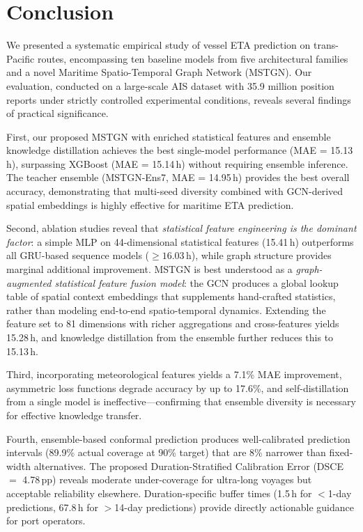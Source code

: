 \documentclass[conference]{IEEEtran}
\begin{document}
\section{Conclusion}

We presented a systematic empirical study of vessel ETA prediction on trans-Pacific routes, encompassing ten baseline models from five architectural families and a novel Maritime Spatio-Temporal Graph Network (MSTGN).
Our evaluation, conducted on a large-scale AIS dataset with 35.9 million position reports under strictly controlled experimental conditions, reveals several findings of practical significance.

First, our proposed MSTGN with enriched statistical features and ensemble knowledge distillation achieves the best single-model performance (MAE = 15.13\,h), surpassing XGBoost (MAE = 15.14\,h) without requiring ensemble inference.
The teacher ensemble (MSTGN-Ens7, MAE = 14.95\,h) provides the best overall accuracy, demonstrating that multi-seed diversity combined with GCN-derived spatial embeddings is highly effective for maritime ETA prediction.

Second, ablation studies reveal that \textit{statistical feature engineering is the dominant factor}: a simple MLP on 44-dimensional statistical features (15.41\,h) outperforms all GRU-based sequence models (${\geq}16.03$\,h), while graph structure provides marginal additional improvement.
MSTGN is best understood as a \textit{graph-augmented statistical feature fusion model}: the GCN produces a global lookup table of spatial context embeddings that supplements hand-crafted statistics, rather than modeling end-to-end spatio-temporal dynamics.
Extending the feature set to 81 dimensions with richer aggregations and cross-features yields 15.28\,h, and knowledge distillation from the ensemble further reduces this to 15.13\,h.

Third, incorporating meteorological features yields a 7.1\% MAE improvement, asymmetric loss functions degrade accuracy by up to 17.6\%, and self-distillation from a single model is ineffective---confirming that ensemble diversity is necessary for effective knowledge transfer.

Fourth, ensemble-based conformal prediction produces well-calibrated prediction intervals (89.9\% actual coverage at 90\% target) that are 8\% narrower than fixed-width alternatives.
The proposed Duration-Stratified Calibration Error (DSCE $=$ 4.78\,pp) reveals moderate under-coverage for ultra-long voyages but acceptable reliability elsewhere.
Duration-specific buffer times (1.5\,h for $<$1-day predictions, 67.8\,h for $>$14-day predictions) provide directly actionable guidance for port operators.
\end{document}
